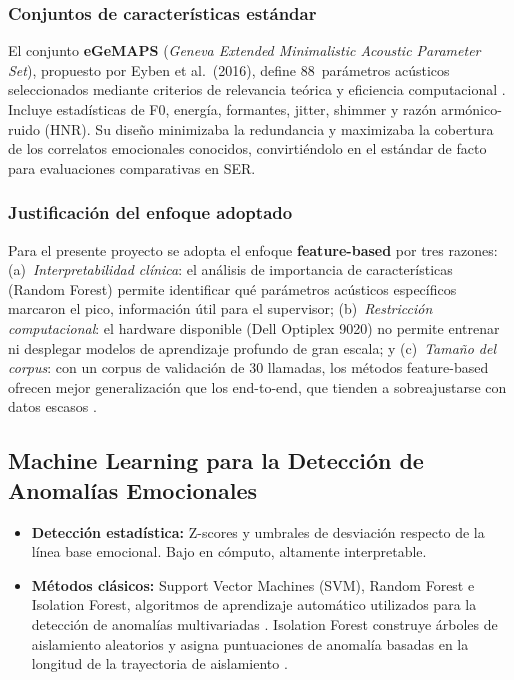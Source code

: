 \subsubsection{Conjuntos de características estándar}

El conjunto \textbf{eGeMAPS} (\textit{Geneva Extended Minimalistic Acoustic Parameter
Set}), propuesto por Eyben et al.\ (2016), define 88~parámetros acústicos seleccionados
mediante criterios de relevancia teórica y eficiencia computacional
\cite{eyben2016gemaps}. Incluye estadísticas de F0, energía, formantes, jitter, shimmer
y razón armónico-ruido (HNR). Su diseño minimizaba la redundancia y maximizaba la
cobertura de los correlatos emocionales conocidos, convirtiéndolo en el estándar de
facto para evaluaciones comparativas en SER.

\subsubsection{Justificación del enfoque adoptado}

Para el presente proyecto se adopta el enfoque \textbf{feature-based} por tres
razones: (a)~\textit{Interpretabilidad clínica}: el análisis de importancia de
características (Random Forest) permite identificar qué parámetros acústicos
específicos marcaron el pico, información útil para el supervisor; (b)~\textit{Restricción
computacional}: el hardware disponible (Dell Optiplex 9020) no permite entrenar ni
desplegar modelos de aprendizaje profundo de gran escala; y (c)~\textit{Tamaño del
corpus}: con un corpus de validación de 30 llamadas, los métodos feature-based ofrecen
mejor generalización que los end-to-end, que tienden a sobreajustarse con datos
escasos \cite{khare2024, nath2024}.

\subsection{Machine Learning para la Detección de Anomalías Emocionales}
\label{sec:rt_ml}

\begin{itemize}
    \item \textbf{Detección estadística:} Z-scores y umbrales de desviación respecto
          de la línea base emocional. Bajo en cómputo, altamente interpretable.
    \item \textbf{Métodos clásicos:} Support Vector Machines (SVM), Random Forest e
          Isolation Forest, algoritmos de aprendizaje automático utilizados para la
          detección de anomalías multivariadas \cite{wagner2023, xu2023, nath2024}.
          Isolation Forest construye árboles de aislamiento aleatorios y asigna
          puntuaciones de anomalía basadas en la longitud de la trayectoria de
          aislamiento \cite{xu2023}.
\end{itemize}

